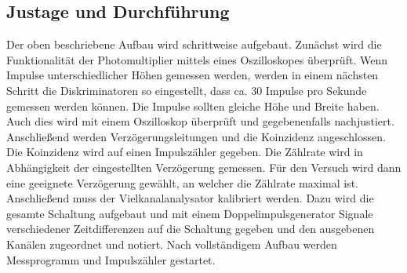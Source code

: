 \subsection{Justage und Durchführung}
Der oben beschriebene Aufbau wird schrittweise aufgebaut.
Zunächst wird die Funktionalität der Photomultiplier mittels eines Oszilloskopes überprüft.
Wenn Impulse unterschiedlicher Höhen gemessen werden, werden in einem nächsten Schritt die Diskriminatoren
so eingestellt, dass ca. 30 Impulse pro Sekunde gemessen werden können. Die Impulse sollten gleiche Höhe
und Breite haben. Auch dies wird mit einem Oszilloskop überprüft und gegebenenfalls nachjustiert.
Anschließend werden Verzögerungsleitungen und die Koinzidenz angeschlossen. Die Koinzidenz wird auf einen Impulszähler
gegeben. Die Zählrate wird in Abhängigkeit der eingestellten Verzögerung gemessen.
Für den Versuch wird dann eine geeignete Verzögerung gewählt, an welcher die Zählrate maximal ist.
Anschließend muss der Vielkanalanalysator kalibriert werden. Dazu wird die gesamte Schaltung aufgebaut und
mit einem Doppelimpulsgenerator Signale verschiedener Zeitdifferenzen auf die Schaltung gegeben und den ausgebenen
Kanälen zugeordnet und notiert.
Nach vollständigem Aufbau werden Messprogramm und Impulszähler gestartet.
